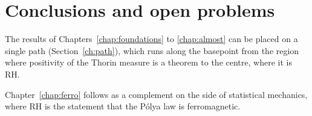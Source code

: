 \chapter{Conclusions and open problems}\label{chap:conclusions}

The results of Chapters~\ref{chap:foundations} to \ref{chap:almost} can be placed on a single path (Section~\ref{ch:path}), which runs along the basepoint from the region where positivity of the Thorin measure is a theorem to the centre, where it is RH.

Chapter~\ref{chap:ferro} follows as a complement on the side of statistical mechanics, where RH is the statement that the P\'olya law is ferromagnetic.
